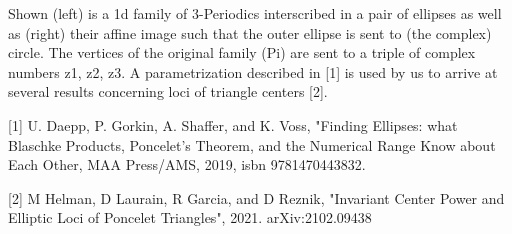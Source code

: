 Shown (left) is a 1d family of 3-Periodics interscribed in a pair of ellipses as well as (right) their affine image such that the outer ellipse is sent to (the complex) circle. The vertices of the original family (Pi) are sent to a triple of complex numbers z1, z2, z3. A parametrization described in [1] is used by us to arrive at several results concerning loci of triangle centers [2].

[1] U. Daepp, P. Gorkin, A. Shaffer, and K. Voss, "Finding Ellipses: what Blaschke Products, Poncelet’s Theorem, and the Numerical Range Know about Each Other, MAA Press/AMS, 2019, isbn 9781470443832.

[2] M Helman, D Laurain, R Garcia, and D Reznik, "Invariant Center Power and Elliptic Loci of Poncelet Triangles", 2021. arXiv:2102.09438
